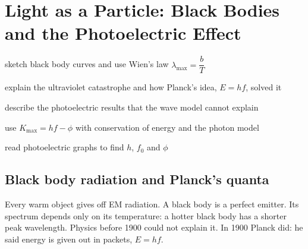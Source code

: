 \chapter{Light as a Particle: Black Bodies and the Photoelectric Effect}\label{ch3:chap}


\begin{goals}
  \item sketch black body curves and use Wien's law $\lambda_\mathrm{max} = \dfrac{b}{T}$
  \item explain the ultraviolet catastrophe and how Planck's idea, $E = hf$, solved it
  \item describe the photoelectric results that the wave model cannot explain
  \item use $K_\mathrm{max} = hf - \phi$ with conservation of energy and the photon model
  \item read photoelectric graphs to find $h$, $f_0$ and $\phi$
\end{goals}

\section{Black body radiation and Planck's quanta}\label{ch3:sec:blackbody}

\begin{bigidea}
Every warm object gives off EM radiation. A black body is a perfect emitter. Its
spectrum depends only on its temperature: a hotter black body has a shorter peak
wavelength. Physics before 1900 could not explain it. In 1900 Planck did: he said
energy is given out in packets, $E = hf$.
\end{bigidea}

\begin{keywords}
\end{keywords}

